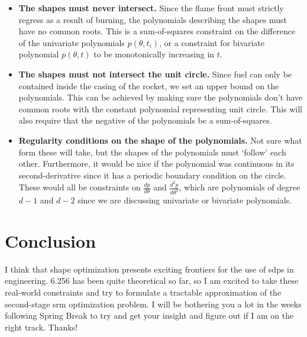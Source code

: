 \documentclass[11pt]{article}
\begin{document}
\begin{itemize}
\item \textbf{The shapes must never intersect.} Since the flame front must strictly regress as a result of burning, the polynomials describing the shapes must have no common roots. This is a sum-of-squares constraint on the difference of the univariate polynomials $p(\theta, t_i)$, or a constraint for bivariate polynomial $p(\theta, t)$ to be monotonically increasing in $t$. 
\item\textbf{The shapes must not intersect the unit circle.} Since fuel can only be contained inside the casing of the rocket, we set an upper bound on the polynomials. This can be achieved by making sure the polynomials don't have common roots with the constant polynomial representing unit circle. This will also require that the negative of the polynomials be a sum-of-squares. 
\item \textbf{Regularity conditions on the shape of the polynomials.} Not sure what form these will take, but the shapes of the polynomials must `follow' each other. Furthermore, it would be nice if the polynomial was continuous in its second-derivative since it has a periodic boundary condition on the circle. These would all be constraints on $\frac{dp}{d\theta}$ and $\frac{d^2p}{d\theta^2}$, which are polynomials of degree $d-1$ and $d-2$ since we are discussing univariate or bivariate polynomials. 
\end{itemize}

\section{Conclusion}

I think that shape optimization presents exciting frontiers for the use of \gls{sdp}s in engineering. 6.256 has been quite theoretical so far, so I am excited to take these real-world constraints and try to formulate a tractable approximation of the second-stage \gls{srm} optimization problem. I will be bothering you a lot in the weeks following Spring Break to try and get your insight and figure out if I am on the right track. Thanks! 
\end{document}

